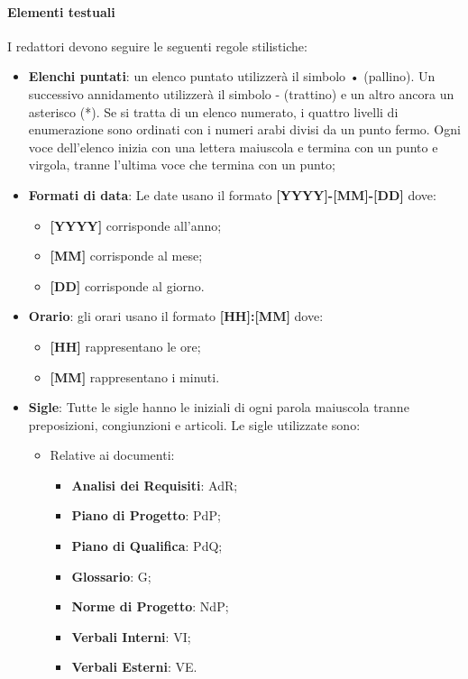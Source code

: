 \paragraph{Elementi testuali}
I redattori devono seguire le seguenti regole stilistiche:
\begin{itemize}
\item \textbf{Elenchi puntati}: un elenco puntato utilizzerà il simbolo • (pallino). Un successivo annidamento utilizzerà il simbolo - (trattino) e un altro ancora un asterisco (*). Se si tratta di un elenco numerato, i quattro livelli di enumerazione sono ordinati con i numeri arabi divisi da un punto fermo. Ogni voce dell’elenco inizia con una lettera maiuscola e termina con un punto e virgola, tranne l'ultima voce che termina con un punto;

\item \textbf{Formati di data}: Le date usano il formato \textbf{[YYYY]-[MM]-[DD]} dove:
    \begin{itemize}
    \item \textbf{[YYYY]} corrisponde all’anno;
    \item \textbf{[MM]} corrisponde al mese;
    \item \textbf{[DD]} corrisponde al giorno.
    \end{itemize}

\item \textbf{Orario}: gli orari usano il formato \textbf{[HH]:[MM]} dove:
    \begin{itemize}
    \item \textbf{[HH]} rappresentano le ore;
    \item \textbf{[MM]} rappresentano i minuti.
    \end{itemize}

\item \textbf{Sigle}: Tutte le sigle hanno le iniziali di ogni parola maiuscola tranne preposizioni, congiunzioni e articoli. Le sigle utilizzate sono:
    \begin{itemize}
    \item Relative ai documenti:
        \begin{itemize}
        \item \textbf{Analisi dei Requisiti}: AdR;
        \item \textbf{Piano di Progetto}: PdP;
        \item \textbf{Piano di Qualifica}: PdQ;
        \item \textbf{Glossario}: G;
        \item \textbf{Norme di Progetto}: NdP;
        \item \textbf{Verbali Interni}: VI;
        \item \textbf{Verbali Esterni}: VE.
        \end{itemize}
    

\end{itemize}
\end{itemize}
